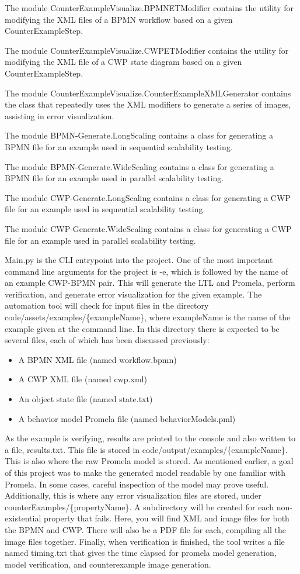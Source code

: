 The module CounterExampleVisualize.BPMNETModifier contains the utility for modifying the XML files of a BPMN workflow based on a given CounterExampleStep.

The module CounterExampleVisualize.CWPETModifier contains the utility for modifying the XML file of a CWP state diagram based on a given CounterExampleStep.

The module CounterExampleVisualize.CounterExampleXMLGenerator contains the class that repeatedly uses the XML modifiers to generate a series of images, assisting in error visualization.

The module BPMN-Generate.LongScaling contains a class for generating a BPMN file for an example used in sequential scalability testing.

The module BPMN-Generate.WideScaling contains a class for generating a BPMN file for an example used in parallel scalability testing.

The module CWP-Generate.LongScaling  contains a class for generating a CWP file for an example used in sequential scalability testing.

The module CWP-Generate.WideScaling contains a class for generating a CWP file for an example used in parallel scalability testing.

Main.py is the CLI entrypoint into the project. One of the most important command line arguments for the project is -e, which is followed by the name of an example CWP-BPMN pair. This will generate the LTL and Promela, perform verification, and generate error visualization for the given example. The automation tool will check for input files in the directory code/assets/examples/\{exampleName\}, where exampleName is the name of the example given at the command line. In this directory there is expected to be several files, each of which has been discussed previously:
\begin{itemize}
\item A BPMN XML file (named workflow.bpmn)
\item A CWP XML file (named cwp.xml)
\item An object state file (named state.txt)
\item A behavior model Promela file (named behaviorModels.pml)
\end{itemize}

As the example is verifying, results are printed to the console and also written to a file, results.txt. This file is stored in code/output/examples/\{exampleName\}. This is also where the raw Promela model is stored. As mentioned earlier, a goal of this project was to make the generated model readable by one familiar with Promela. In some cases, careful inspection of the model may prove useful. Additionally, this is where any error visualization files are stored, under counterExamples/\{propertyName\}. A subdirectory will be created for each non-existential property that fails. Here, you will find XML and image files for both the BPMN and CWP. There will also be a PDF file for each, compiling all the image files together. Finally, when verification is finished, the tool writes a file named timing.txt that gives the time elapsed for promela model generation, model verification, and counterexample image generation.
